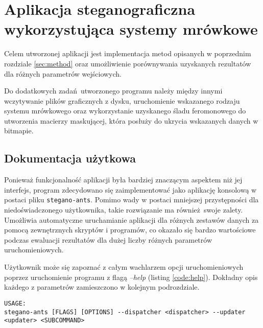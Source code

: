 \chapter{Aplikacja steganograficzna wykorzystująca systemy mrówkowe}\label{chap:implementation}
{
    Celem utworzonej aplikacji jest implementacja metod opisanych w poprzednim rozdziale \ref{sec:method} oraz
    umożliwienie porównywania uzyskanych rezultatów dla różnych parametrów wejściowych.

    Do dodatkowych zadań utworzonego programu należy między innymi wczytywanie plików graficznych z dysku, uruchomienie
    wskazanego rodzaju systemu mrówkowego oraz wykorzystanie uzyskanego śladu feromonowego do utworzenia macierzy
    maskującej, która posłuży do ukrycia wskazanych danych w bitmapie.

    \section{Dokumentacja użytkowa}
    {
        Ponieważ funkcjonalność aplikacji była bardziej znaczącym aspektem niż jej interfejs, program zdecydowano się
        zaimplementować jako aplikację konsolową w postaci pliku \texttt{stegano-ants}. Pomimo wady w postaci mniejszej
        przystępności dla niedoświadczonego użytkownika, takie rozwiązanie ma również swoje zalety. Umożliwia
        automatyczne uruchamianie aplikacji dla różnych zestawów danych za pomocą zewnętrznych skryptów i programów, co
        okazało się bardzo wartościowe podczas ewaluacji rezultatów dla dużej liczby różnych parametrów
        uruchomieniowych.

        Użytkownik może się zapoznać z całym wachlarzem opcji uruchomieniowych poprzez uruchomienie
        programu z flagą \textit{--help} (listing \ref{code:help}). Dokładny opis każdego z parametrów zamieszczono w
        kolejnym podrozdziale.

        \begin{lstlisting}[basicstyle=\tiny, caption=Pomoc programu, label=code:help]
USAGE:
stegano-ants [FLAGS] [OPTIONS] --dispatcher <dispatcher> --updater <updater> <SUBCOMMAND>


\end{lstlisting}}}
